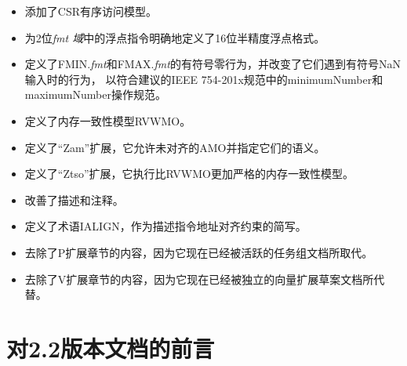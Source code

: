\begin{itemize}
\item 添加了CSR有序访问模型。

\item 为2位{\em fmt 域}中的浮点指令明确地定义了16位半精度浮点格式。

\item 定义了FMIN.{\em fmt}和FMAX.{\em fmt}的有符号零行为，并改变了它们遇到有符号NaN输入时的行为，
以符合建议的IEEE 754-201x规范中的minimumNumber和maximumNumber操作规范。

\item 定义了内存一致性模型RVWMO。

\item 定义了“Zam”扩展，它允许未对齐的AMO并指定它们的语义。

\item 定义了“Ztso”扩展，它执行比RVWMO更加严格的内存一致性模型。

\item 改善了描述和注释。

\item 定义了术语IALIGN，作为描述指令地址对齐约束的简写。

\item 去除了P扩展章节的内容，因为它现在已经被活跃的任务组文档所取代。

\item 去除了V扩展章节的内容，因为它现在已经被独立的向量扩展草案文档所代替。

\end{itemize}

\FloatBarrier

\section*{对2.2版本文档的前言}

